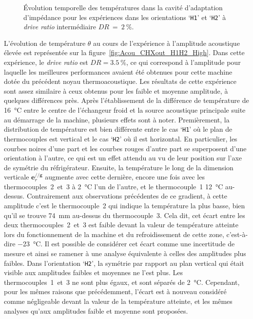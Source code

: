 \begin{figure}[!ht]
    \centering
    
    \caption{\'Evolution temporelle des températures dans la cavité d'adaptation d'impédance pour les expériences dans les orientations `\texttt{H1}' et `\texttt{H2}' à \textit{drive ratio} intermédiaire $DR~=~\qty{2}{\percent}$.}
    \label{fig:Acou_CHXout_H1H2_Mid}
\end{figure}

L'évolution de température $\theta$ au cours de l'expérience à l'amplitude acoustique \og élevée \fg{} est représentée sur la figure~\ref{fig:Acou_CHXout_H1H2_High}. Dans cette expérience, le \textit{drive ratio} est $DR=\qty{3.5}{\percent}$, ce qui correspond à l'amplitude pour laquelle les meilleures performances avaient été obtenues pour cette machine dotée du précédent noyau thermoacoustique. Les résultats de cette expérience sont assez similaire à ceux obtenus pour les faible et moyenne amplitude, à quelques différences près. Après l'établissement de la différence de température de \qty{16}{\degreeCelsius} entre le centre de l'échangeur froid et la source acoustique principale suite au démarrage de la machine, plusieurs effets sont à noter. Premièrement, la distribution de température est bien différente entre le cas `\texttt{H1}' où le plan de thermocouples est vertical et le cas `\texttt{H2}' où il est horizontal. En particulier, les courbes noires d'une part et les courbes rouges d'autre part se superposent d'une orientation à l'autre, ce qui est un effet attendu au vu de leur position sur l'axe de symétrie du réfrigérateur. Ensuite, la température le long de la dimension verticale $\mathbf e_r^{//\mathbf g}$ augmente avec cette dernière, encore une fois avec les thermocouples~2~et~3 à \qty{2}{\degreeCelsius} l'un de l'autre, et le thermocouple~1 \qty{12}{\degreeCelsius} au-dessus. Contrairement aux observations précédentes de ce gradient, à cette amplitude c'est le thermocouple~2 qui indique la température la plus basse, bien qu'il se trouve \qty{74}{\milli\meter} au-dessus du thermocouple~3. Cela dit, cet écart entre les deux thermocouples~2~et~3 est faible devant la valeur de température atteinte lors du fonctionnement de la machine et du refroidissement de cette zone, c'est-à-dire \qty{-23}{\degreeCelsius}. Il est possible de considérer cet écart comme une incertitude de mesure et ainsi se ramener à une analyse équivalente à celles des amplitudes plus faibles. Dans l'orientation `\texttt{H2}', la symétrie par rapport au plan vertical qui était visible aux amplitudes faibles et moyennes ne l'est plus. Les thermocouples~1~et~3 ne sont plus égaux, et sont séparés de \qty{2}{\degreeCelsius}. Cependant, pour les mêmes raisons que précédemment, l'écart est à nouveau considéré comme négligeable devant la valeur de la température atteinte, et les mêmes analyses qu'aux amplitudes faible et moyenne sont proposées.

